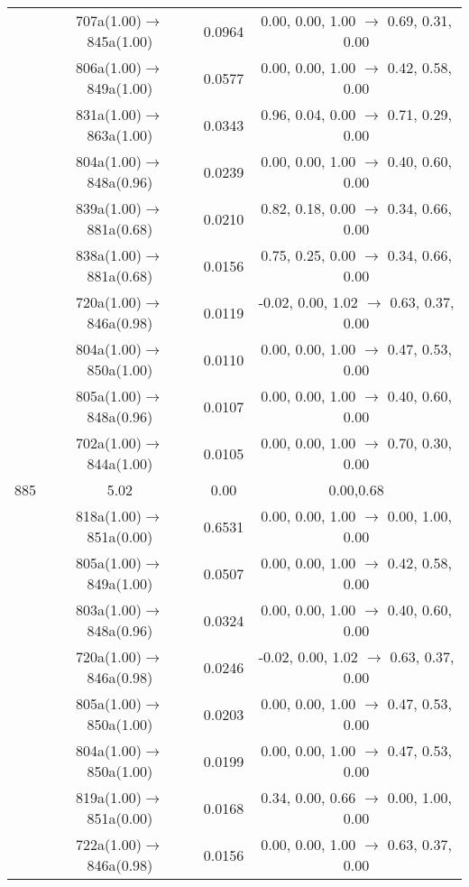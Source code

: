 \documentclass[10pt,a4paper]{article}
\begin{document}
\begin{longtable}{c|c|c|c}
 	& 707a(1.00)$\rightarrow$845a(1.00) &	 0.0964 &	 0.00, 0.00, 1.00 $\rightarrow$ 0.69, 0.31, 0.00 \\ 
 	& 806a(1.00)$\rightarrow$849a(1.00) &	 0.0577 &	 0.00, 0.00, 1.00 $\rightarrow$ 0.42, 0.58, 0.00 \\ 
 	& 831a(1.00)$\rightarrow$863a(1.00) &	 0.0343 &	 0.96, 0.04, 0.00 $\rightarrow$ 0.71, 0.29, 0.00 \\ 
 	& 804a(1.00)$\rightarrow$848a(0.96) &	 0.0239 &	 0.00, 0.00, 1.00 $\rightarrow$ 0.40, 0.60, 0.00 \\ 
 	& 839a(1.00)$\rightarrow$881a(0.68) &	 0.0210 &	 0.82, 0.18, 0.00 $\rightarrow$ 0.34, 0.66, 0.00 \\ 
 	& 838a(1.00)$\rightarrow$881a(0.68) &	 0.0156 &	 0.75, 0.25, 0.00 $\rightarrow$ 0.34, 0.66, 0.00 \\ 
 	& 720a(1.00)$\rightarrow$846a(0.98) &	 0.0119 &	 -0.02, 0.00, 1.02 $\rightarrow$ 0.63, 0.37, 0.00 \\ 
 	& 804a(1.00)$\rightarrow$850a(1.00) &	 0.0110 &	 0.00, 0.00, 1.00 $\rightarrow$ 0.47, 0.53, 0.00 \\ 
 	& 805a(1.00)$\rightarrow$848a(0.96) &	 0.0107 &	 0.00, 0.00, 1.00 $\rightarrow$ 0.40, 0.60, 0.00 \\ 
 	& 702a(1.00)$\rightarrow$844a(1.00) &	 0.0105 &	 0.00, 0.00, 1.00 $\rightarrow$ 0.70, 0.30, 0.00 \\ 
 \hline885 &	 5.02 &	 0.00 &	 0.00,0.68 \\ 
  	& 818a(1.00)$\rightarrow$851a(0.00) &	 0.6531 &	 0.00, 0.00, 1.00 $\rightarrow$ 0.00, 1.00, 0.00 \\ 
 	& 805a(1.00)$\rightarrow$849a(1.00) &	 0.0507 &	 0.00, 0.00, 1.00 $\rightarrow$ 0.42, 0.58, 0.00 \\ 
 	& 803a(1.00)$\rightarrow$848a(0.96) &	 0.0324 &	 0.00, 0.00, 1.00 $\rightarrow$ 0.40, 0.60, 0.00 \\ 
 	& 720a(1.00)$\rightarrow$846a(0.98) &	 0.0246 &	 -0.02, 0.00, 1.02 $\rightarrow$ 0.63, 0.37, 0.00 \\ 
 	& 805a(1.00)$\rightarrow$850a(1.00) &	 0.0203 &	 0.00, 0.00, 1.00 $\rightarrow$ 0.47, 0.53, 0.00 \\ 
 	& 804a(1.00)$\rightarrow$850a(1.00) &	 0.0199 &	 0.00, 0.00, 1.00 $\rightarrow$ 0.47, 0.53, 0.00 \\ 
 	& 819a(1.00)$\rightarrow$851a(0.00) &	 0.0168 &	 0.34, 0.00, 0.66 $\rightarrow$ 0.00, 1.00, 0.00 \\ 
 	& 722a(1.00)$\rightarrow$846a(0.98) &	 0.0156 &	 0.00, 0.00, 1.00 $\rightarrow$ 0.63, 0.37, 0.00 \\ 

\end{longtable}
\end{document}
